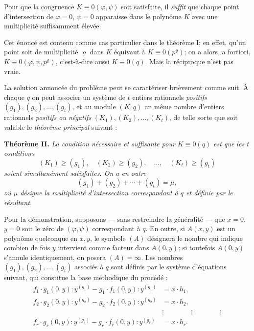Pour que la congruence $K\equiv0(\varphi,\psi)$ soit satisfaite, il \emph{suffit} que chaque point d'intersection de $\varphi=0$, $\psi=0$ apparaisse dans le polynôme $K$ avec une multiplicité \og suffisamment\fg{} élevée.

Cet énoncé est contenu comme cas particulier dans le théorème I; en effet, qu'un point soit de multiplicité $\varrho$ dans $K$ équivaut à $K\equiv0(p^\varrho)$; on a alors, a fortiori, $K\equiv0(\varphi,\psi,p^\varrho)$, c'est-à-dire aussi $K\equiv0(q)$. Mais la réciproque n'est pas vraie.

La solution annoncée du problème peut se caractériser brièvement comme suit. À chaque $q$ on peut associer un système de $t$ entiers rationnels \emph{positifs} $(g_1),(g_2),\ldots,(g_t)$, et au module $(K,q)$ un même nombre d'entiers rationnels \emph{positifs ou négatifs} $(K_1),(K_2),\ldots,(K_t)$, de telle sorte que soit valable le \emph{théorème principal} suivant :

\textbf{Théorème II.} \emph{La condition nécessaire et suffisante pour $K\equiv0(q)$ est que les $t$ conditions}
\[
(K_1)\geq(g_1),\quad (K_2)\geq(g_2),\quad\ldots,\quad (K_t)\geq(g_t)
\]
\emph{soient simultanément satisfaites. On a en outre}
\[
(g_1)+(g_2)+\cdots+(g_t)=\mu,
\]
\emph{où $\mu$ désigne la multiplicité d'intersection correspondant à $q$ et définie par le résultant.}

Pour la démonstration, supposons --- sans restreindre la généralité --- que $x=0$, $y=0$ soit le zéro de $(\varphi,\psi)$ correspondant à $q$. En outre, si $A(x,y)$ est un polynôme quelconque en $x,y$, le symbole $(A)$ désignera le nombre qui indique combien de fois $y$ intervient comme facteur dans $A(0,y)$; si toutefois $A(0,y)$ s'annule identiquement, on posera $(A)=\infty$. Les nombres $(g_1),(g_2),\ldots,(g_t)$ associés à $q$ sont définis par le système d'équations suivant, qui constitue la base méthodique du procédé :
\begin{equation}
\tag{1}
\begin{aligned}
f_1\cdot g_1(0,y):y^{(g_1)}-g_1\cdot f_1(0,y):y^{(g_1)}&=x\cdot h_1,\\
f_2\cdot g_2(0,y):y^{(g_2)}-g_2\cdot f_2(0,y):y^{(g_2)}&=x\cdot h_2,\\
&\vdots\qquad\qquad\vdots\qquad\qquad\vdots\\
f_r\cdot g_r(0,y):y^{(g_r)}-g_r\cdot f_r(0,y):y^{(g_r)}&=x\cdot h_r.
\end{aligned}
\end{equation}

